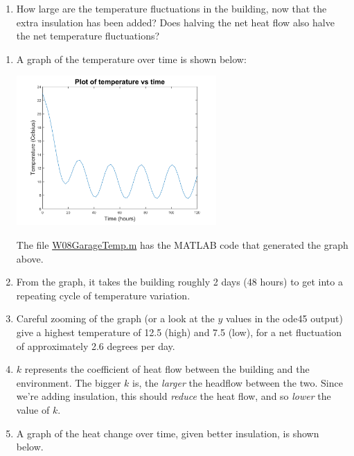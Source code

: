 \begin{enumerate}
\begin{Question}
\begin{enumerate}
\item How large are the temperature fluctuations in the building, now
  that the extra insulation has been added?  Does halving the net heat
  flow also halve the net temperature fluctuations?
\end{enumerate}
  
\end{Question}

\begin{Solution}
\begin{enumerate}
\item  A graph of the temperature over time is shown below: 
  
  \includegraphics[width=3in]{graphics/Week08_Spring/W08GarageTemp_1}

The file 
  \href{http://www.mast.queensu.ca/~apsc171/MNTCP01/PracticeProblems/MATLAB/W08GarageTemp.m}{W08GarageTemp.m} 
has the MATLAB code that generated the graph above.

\item From the graph, it takes the building roughly 2 days (48 hours)
  to get into a repeating cycle of temperature variation.

\item Careful zooming of the graph (or a look at the $y$ values in the
  ode45 output) give a highest temperature of 12.5 (high) and 7.5
  (low), for a net fluctuation of approximately 2.6 degrees per day.

\item $k$ represents the coefficient of heat flow between the building
  and the environment. The bigger $k$ is, the {\em larger} the
  headflow between the two.  Since we're adding insulation, this
  should {\em reduce} the heat flow, and so {\em lower} the value of
  $k$.

\item A graph of the heat change over time, given better insulation,
  is shown below.


\end{enumerate}
\end{Solution}
\end{enumerate}
